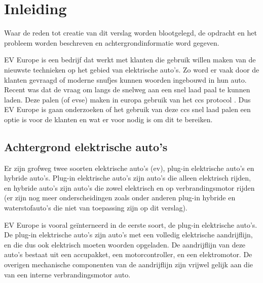 \chapter{Inleiding}
\label{inleiding}

\begin{center}
    \begin{minipage}{0.5\textwidth}
        \begin{small}
            Waar de reden tot creatie van dit verslag worden blootgelegd, de
            opdracht en het probleem worden beschreven en achtergrondinformatie
            word gegeven.
        \end{small}
    \end{minipage}
    \vspace{0.5cm}
\end{center}

\noindent EV Europe is een bedrijf dat werkt met klanten die gebruik willen
maken van de nieuwste technieken op het gebied van elektrische auto's. Zo word
er vaak door de klanten gevraagd of moderne snufjes kunnen woorden ingebouwd in
hun auto. Recent was dat de vraag om langs de snelweg aan een snel laad paal te
kunnen laden. Deze palen (of \ac{evse}) maken in europa gebruik van het \ac{ccs}
protocol \cite{Directive_2014/94/EU}. Dus EV Europe is gaan onderzoeken of het
gebruik van deze \ac{ccs} snel laad palen een optie is voor de klanten en wat er
voor nodig is om dit te bereiken.

\section{Achtergrond elektrische auto's}

Er zijn grofweg twee soorten elektrische auto's (\ac{ev}), plug-in elektrische
auto's en hybride auto's. Plug-in elektrische auto's zijn auto's die alleen
elektrisch rijden, en hybride auto's zijn auto's die zowel elektrisch en op
verbrandingsmotor rijden (er zijn nog meer onderscheidingen zoals onder anderen
plug-in hybride en waterstofauto's die niet van toepassing zijn op dit
verslag).

EV Europe is vooral geïnterneerd in de eerste soort, de plug-in elektrische
auto's. De plug-in elektrische auto's zijn auto's met een volledig elektrische
aandrijflijn, en die dus ook elektrisch moeten woorden opgeladen. De
aandrijflijn van deze auto's bestaat uit een accupakket, een motorcontroller,
en een elektromotor. De overigen mechanische componenten van de aandrijflijn
zijn vrijwel gelijk aan die van een interne verbrandingsmotor auto.


